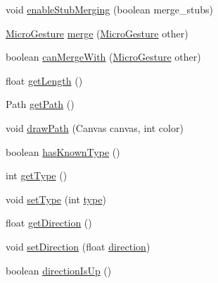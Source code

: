 \begin{DoxyCompactItemize}
void \hyperlink{classch_1_1zhaw_1_1ba10__bsha__1_1_1service_1_1MicroGesture_ad5c219a463ce524eb0778e71717e7938}{enableStubMerging} (boolean merge\_\-stubs)
\item 
\hyperlink{classch_1_1zhaw_1_1ba10__bsha__1_1_1service_1_1MicroGesture}{MicroGesture} \hyperlink{classch_1_1zhaw_1_1ba10__bsha__1_1_1service_1_1MicroGesture_a363ee314636824c156497dd7138edaa9}{merge} (\hyperlink{classch_1_1zhaw_1_1ba10__bsha__1_1_1service_1_1MicroGesture}{MicroGesture} other)
\item 
boolean \hyperlink{classch_1_1zhaw_1_1ba10__bsha__1_1_1service_1_1MicroGesture_aa86fa9810f2f6155bf027c5c358861bd}{canMergeWith} (\hyperlink{classch_1_1zhaw_1_1ba10__bsha__1_1_1service_1_1MicroGesture}{MicroGesture} other)
\item 
float \hyperlink{classch_1_1zhaw_1_1ba10__bsha__1_1_1service_1_1MicroGesture_ad2000095a1aaed409721b5580382639f}{getLength} ()
\item 
Path \hyperlink{classch_1_1zhaw_1_1ba10__bsha__1_1_1service_1_1MicroGesture_a9640a018716e9a2ff309360071af6be7}{getPath} ()
\item 
void \hyperlink{classch_1_1zhaw_1_1ba10__bsha__1_1_1service_1_1MicroGesture_aa06eca44734c4df4bc13c1d045724904}{drawPath} (Canvas canvas, int color)
\item 
boolean \hyperlink{classch_1_1zhaw_1_1ba10__bsha__1_1_1service_1_1MicroGesture_a85e524f74a8ae04db9418ddecb835bcd}{hasKnownType} ()
\item 
int \hyperlink{classch_1_1zhaw_1_1ba10__bsha__1_1_1service_1_1MicroGesture_a010dd89f21ef5ac1ed012ae1f4b7e80e}{getType} ()
\item 
void \hyperlink{classch_1_1zhaw_1_1ba10__bsha__1_1_1service_1_1MicroGesture_ae7f33d544189f7cf99710d8694beec56}{setType} (int \hyperlink{classch_1_1zhaw_1_1ba10__bsha__1_1_1service_1_1MicroGesture_ac1ee8b835a0b20d0e3535682eb0d2741}{type})
\item 
float \hyperlink{classch_1_1zhaw_1_1ba10__bsha__1_1_1service_1_1MicroGesture_a60d90eeae25a237c877d088da699874e}{getDirection} ()
\item 
void \hyperlink{classch_1_1zhaw_1_1ba10__bsha__1_1_1service_1_1MicroGesture_ab3b057406a8b11af28ec1bb73be22e58}{setDirection} (float \hyperlink{classch_1_1zhaw_1_1ba10__bsha__1_1_1service_1_1MicroGesture_a99f2fb0a7f8e2667b5fb8043dde76ff8}{direction})
\item 
boolean \hyperlink{classch_1_1zhaw_1_1ba10__bsha__1_1_1service_1_1MicroGesture_ac7b68d3f3a9efd30535baf0c60b9024f}{directionIsUp} ()
\item 

\end{DoxyCompactItemize}
